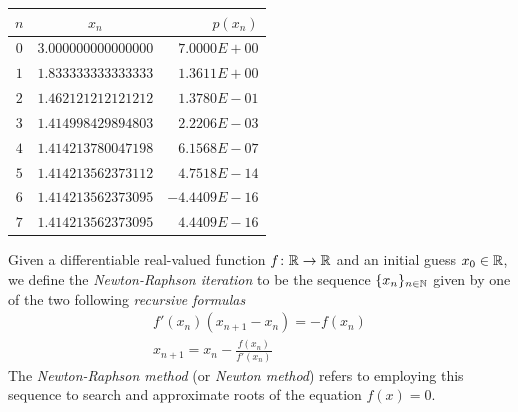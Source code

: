 \begin{center}\label{table:Newton-Raphson}
\begin{tabular}{|c|c|r|} \hline 
$n$ & $x_n$ & $p(x_n)$ \\ \hline \hline 
$0$ & $3.000000000000000$ & $7.0000E+00$ \\ \hline 
$1$ & $1.833333333333333$ & $1.3611E+00$ \\ \hline 
$2$ & $1.462121212121212$ & $1.3780E-01$ \\ \hline 
$3$ & $1.414998429894803$ & $2.2206E-03$ \\ \hline 
$4$ & $1.414213780047198$ & $6.1568E-07$ \\ \hline 
$5$ & $1.414213562373112$ & $4.7518E-14$ \\ \hline 
$6$ & $1.414213562373095$ & $-4.4409E-16$ \\ \hline 
$7$ & $1.414213562373095$ & $4.4409E-16$ \\ \hline 
\end{tabular}
\end{center}

\begin{definition}
Given a differentiable real-valued function $f\colon \mathbb{R} \to \mathbb{R}$ and an initial guess $x_0 \in \mathbb{R}$, we define the \emph{Newton-Raphson iteration} to be the sequence $\{ x_n \}_{n \in \mathbb{N}}$ given by one of the two following \emph{recursive formulas}
\begin{equation}\label{equation:NewtonRaphson1dim}
\begin{split}
f'(x_n) (x_{n+1}-x_n) = -f(x_n) \\
x_{n+1} = x_n - \frac{f(x_n)}{f'(x_n)}
\end{split}
\end{equation}
The \emph{Newton-Raphson method} (or \emph{Newton method}) refers to employing this sequence to search and approximate roots of the equation $f(x) = 0$.
\end{definition}


